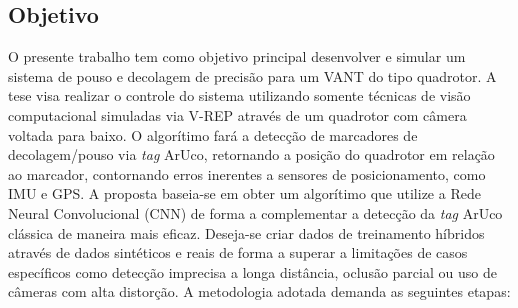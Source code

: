 

\subsection{Objetivo}

O presente trabalho tem como objetivo principal desenvolver e simular um sistema de pouso e decolagem de precisão para um VANT do tipo quadrotor. A tese visa realizar o controle do sistema utilizando somente técnicas de visão computacional simuladas via V-REP através de um quadrotor com câmera voltada para baixo. O algorítimo fará a detecção de marcadores de decolagem/pouso via \textit{tag} ArUco, retornando a posição do quadrotor em relação ao marcador, contornando erros inerentes a sensores de posicionamento, como IMU e GPS. A proposta baseia-se em obter um algorítimo que utilize a Rede Neural Convolucional (CNN) de forma a complementar a detecção da \textit{tag} ArUco clássica de maneira mais eficaz. Deseja-se criar dados de treinamento híbridos através de dados sintéticos e reais de forma a superar a limitações de casos específicos como detecção imprecisa a longa distância, oclusão parcial ou uso de câmeras com alta distorção. A metodologia adotada demanda as seguintes etapas:

